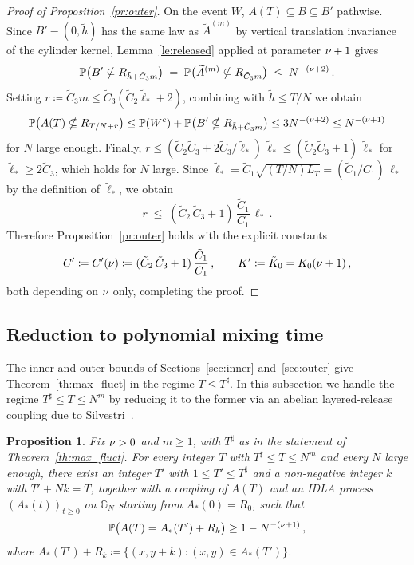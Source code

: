 \documentclass[11pt,a4paper,reqno]{amsart}
\newtheorem{Proposition}[Theorem]{Proposition}
\theoremstyle{definition}
\newcommand{\bbG}{{\ensuremath{\mathbb G}} }
\newcommand{\bbP}{{\ensuremath{\mathbb P}} }
\begin{document}
\begin{proof}[Proof of Proposition~\ref{pr:outer}]
On the event $W$, $A(T) \subseteq B \subseteq B'$ pathwise. Since $B' - (0, \tilde h)$ has the same law as $\widetilde A^{(m)}$ by vertical translation invariance of the cylinder kernel, Lemma~\ref{le:released} applied at parameter $\nu+1$ gives
\[
  \bbP\big(B' \nsubseteq R_{\tilde h + \tilde C_3 m}\big) \;=\; \bbP\big(\widetilde A^{(m)} \nsubseteq R_{\tilde C_3 m}\big) \;\leq\; N^{-(\n+2)}\,.
\]
Setting $r \coloneqq \tilde C_3 m \leq \tilde C_3 (\tilde C_2 \tilde\ell_* + 2)$, combining with $\tilde h \leq T/N$ we obtain
\[
  \bbP\big( A(T) \nsubseteq R_{T/N + r} \big) \leq \bbP(W^c) + \bbP\big(B' \nsubseteq R_{\tilde h + \tilde C_3 m}\big) \leq 3 N^{-(\n + 2)} \leq N^{-(\n+1)}
\]
for $N$ large enough. Finally, $r \leq (\tilde C_2 \tilde C_3 + 2 \tilde C_3/\tilde\ell_*)\,\tilde\ell_* \leq (\tilde C_2 \tilde C_3 + 1)\,\tilde\ell_*$ for $\tilde\ell_* \geq 2 \tilde C_3$, which holds for $N$ large. Since $\tilde\ell_* = \tilde C_1 \sqrt{(T/N) L_T} = (\tilde C_1/C_1)\,\ell_*$ by the definition of $\tilde\ell_*$, we obtain
\[
  r \;\leq\; (\tilde C_2\,\tilde C_3 + 1)\,\frac{\tilde C_1}{C_1}\,\ell_*\,.
\]
Therefore Proposition~\ref{pr:outer} holds with the explicit constants
\[
  C' \coloneqq C'(\nu) \coloneqq (\tilde C_2\,\tilde C_3 + 1)\,\frac{\tilde C_1}{C_1}\,, \qquad K' \coloneqq \tilde K_0 = K_0(\nu + 1)\,,
\]
both depending on $\nu$ only, completing the proof.
\end{proof}

\subsection{Reduction to polynomial mixing time}\label{sec:reduction}
The inner and outer bounds of Sections~\ref{sec:inner} and~\ref{sec:outer} give Theorem~\ref{th:max_fluct} in the regime $T \leq T^\sharp$. In this subsection we handle the regime $T^\sharp \leq T \leq N^m$ by reducing it to the former via an abelian layered-release coupling due to Silvestri~\cite{silvestri2020internal}.

\begin{Proposition}\label{pr:reduction}
Fix $\nu > 0$ and $m \geq 1$, with $T^\sharp$ as in the statement of Theorem~\ref{th:max_fluct}. For every integer $T$ with $T^\sharp \leq T \leq N^m$ and every $N$ large enough, there exist an integer $T'$ with $1 \leq T' \leq T^\sharp$ and a non-negative integer $k$ with $T' + N k = T$, together with a coupling of $A(T)$ and an IDLA process $(A_*(t))_{t \geq 0}$ on $\bbG_N$ starting from $A_*(0) = R_0$, such that
	\[ \bbP\big( A(T) = A_*(T') + R_k \big) \geq 1 - N^{-(\n+1)}\,, \]
where $A_*(T') + R_k \coloneqq \{(x, y+k) : (x, y) \in A_*(T')\}$.
\end{Proposition}
\end{document}
